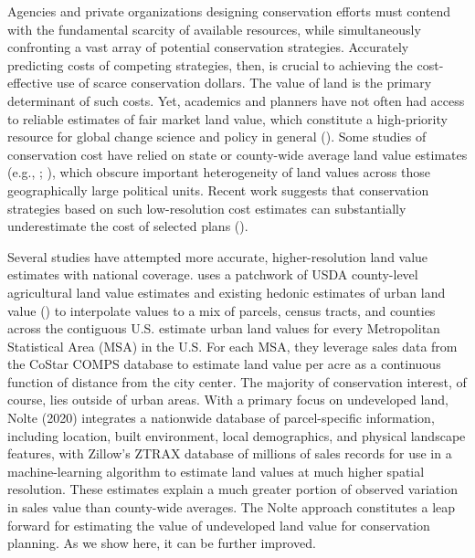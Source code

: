 \documentclass[12pt]{article}
\begin{document}
Agencies and private organizations designing conservation efforts must contend with the fundamental scarcity of available resources, while simultaneously confronting a vast array of potential conservation strategies. Accurately predicting costs of competing strategies, then, is crucial to achieving the cost-effective use of scarce conservation dollars. The value of land is the primary determinant of such costs. Yet, academics and planners have not often had access to reliable estimates of fair market land value, which constitute a high-priority resource for global change science and policy in general (\cite{Coomes2018GeospatialPolicy}). Some studies of conservation cost have relied on state or county-wide average land value estimates (e.g., \cite{Withey2012MaximisingUSA}; \cite{Lawler2020PlanningConfiguration}),
which obscure important heterogeneity of land values across those geographically large political units. Recent work suggests that conservation strategies based on such low-resolution cost estimates can substantially underestimate the cost of selected plans (\cite{Nolte2020High-resolutionStates}). 

Several studies have attempted more accurate, higher-resolution land value estimates with national coverage. \textcite{Larson2015} uses a patchwork of USDA county-level agricultural land value estimates and existing hedonic estimates of urban land value (\cite{Kuminoff2013}) to interpolate values to a mix of parcels, census tracts, and counties across the contiguous U.S. \textcite{Albouy2018} estimate urban land values for every Metropolitan Statistical Area (MSA) in the U.S. For each MSA, they leverage sales data from the CoStar COMPS database to estimate land value per acre as a continuous function of distance from the city center. The majority of conservation interest, of course, lies outside of urban areas. With a primary focus on undeveloped land, Nolte (2020) integrates a nationwide database of parcel-specific information, including location, built environment, local demographics, and physical landscape features, with Zillow’s ZTRAX database of millions of sales records for use in a machine-learning algorithm to estimate land values at much higher spatial resolution. These estimates explain a much greater portion of observed variation in sales value than county-wide averages. The Nolte approach constitutes a leap forward for estimating the value of undeveloped land value for conservation planning. As we show here, it can be further improved.
\end{document}
